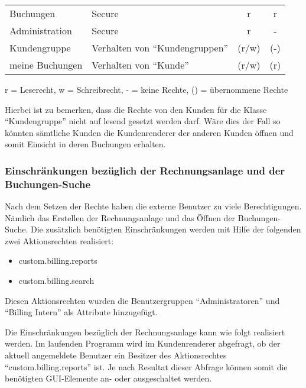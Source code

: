 \begin{minipage}{\linewidth}
\centering
{} \label{tab:katalogrechte}
\begin{tabulary}{\textwidth}{|l|L|C|c|}
 \hline
  &  &  &  \tabularnewline
 \hline 
 Buchungen & Secure & r & r \\ 
 \hline 
 Administration & Secure &r & - \\ 
 \hline 
 Kundengruppe & Verhalten von "`Kundengruppen"' & (r/w) & (-) \\ 
 \hline 
 meine Buchungen & Verhalten von "`Kunde"' & (r/w) & (r) \\ 
 \hline 
 \end{tabulary}
 \par
 \bigskip
 r = Leserecht, w = Schreibrecht, - = keine Rechte, () = übernommene Rechte
 \end{minipage}
 
Hierbei ist zu bemerken, dass die Rechte von den Kunden für die Klasse "`Kundengruppe"' nicht auf lesend gesetzt werden darf. Wäre dies der Fall so könnten sämtliche Kunden die Kundenrenderer der anderen Kunden öffnen und somit Einsicht in deren Buchungen erhalten.

\subsubsection{Einschränkungen bezüglich der Rechnungsanlage und der Buchungen-Suche}

Nach dem Setzen der Rechte haben die externe Benutzer zu viele Berechtigungen.
Nämlich das Erstellen der Rechnungsanlage und das Öffnen der Buchungen-Suche.
Die zusätzlich benötigten Einschränkungen werden mit Hilfe der folgenden zwei Aktionsrechten realisiert:
\begin{itemize}
\item custom.billing.reports
\item custom.billing.search
\end{itemize}
Diesen Aktionsrechten wurden die Benutzergruppen "`Administratoren"' und "`Billing Intern"' als Attribute hinzugefügt.

Die Einschränkungen bezüglich der Rechnungsanlage kann wie folgt realisiert werden.
Im laufenden Programm wird im Kundenrenderer abgefragt, ob der aktuell angemeldete Benutzer ein Besitzer des Aktionsrechtes "`custom.billing.reports"' ist.
Je nach Resultat dieser Abfrage können somit die benötigten GUI-Elemente an- oder ausgeschaltet werden.

